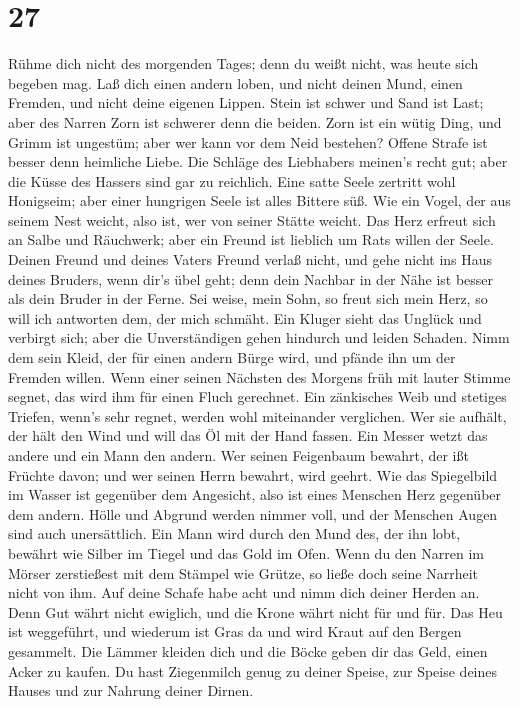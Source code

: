 \hypertarget{section-26}{%
\section{27}\label{section-26}}

 Rühme dich nicht des morgenden Tages; denn du weißt nicht,
was heute sich begeben mag.  Laß dich einen andern loben,
und nicht deinen Mund, einen Fremden, und nicht deine eigenen Lippen.
 Stein ist schwer und Sand ist Last; aber des Narren Zorn
ist schwerer denn die beiden.  Zorn ist ein wütig Ding, und
Grimm ist ungestüm; aber wer kann vor dem Neid bestehen? 
Offene Strafe ist besser denn heimliche Liebe.  Die Schläge
des Liebhabers meinen's recht gut; aber die Küsse des Hassers sind gar
zu reichlich.  Eine satte Seele zertritt wohl Honigseim;
aber einer hungrigen Seele ist alles Bittere süß.  Wie ein
Vogel, der aus seinem Nest weicht, also ist, wer von seiner Stätte
weicht.  Das Herz erfreut sich an Salbe und Räuchwerk; aber
ein Freund ist lieblich um Rats willen der Seele.  Deinen
Freund und deines Vaters Freund verlaß nicht, und gehe nicht ins Haus
deines Bruders, wenn dir's übel geht; denn dein Nachbar in der Nähe ist
besser als dein Bruder in der Ferne.  Sei weise, mein Sohn,
so freut sich mein Herz, so will ich antworten dem, der mich schmäht.
 Ein Kluger sieht das Unglück und verbirgt sich; aber die
Unverständigen gehen hindurch und leiden Schaden.  Nimm dem
sein Kleid, der für einen andern Bürge wird, und pfände ihn um der
Fremden willen.  Wenn einer seinen Nächsten des Morgens
früh mit lauter Stimme segnet, das wird ihm für einen Fluch gerechnet.
 Ein zänkisches Weib und stetiges Triefen, wenn's sehr
regnet, werden wohl miteinander verglichen.  Wer sie
aufhält, der hält den Wind und will das Öl mit der Hand fassen.
 Ein Messer wetzt das andere und ein Mann den andern.
 Wer seinen Feigenbaum bewahrt, der ißt Früchte davon; und
wer seinen Herrn bewahrt, wird geehrt.  Wie das Spiegelbild
im Wasser ist gegenüber dem Angesicht, also ist eines Menschen Herz
gegenüber dem andern.  Hölle und Abgrund werden nimmer
voll, und der Menschen Augen sind auch unersättlich.  Ein
Mann wird durch den Mund des, der ihn lobt, bewährt wie Silber im Tiegel
und das Gold im Ofen.  Wenn du den Narren im Mörser
zerstießest mit dem Stämpel wie Grütze, so ließe doch seine Narrheit
nicht von ihm.  Auf deine Schafe habe acht und nimm dich
deiner Herden an.  Denn Gut währt nicht ewiglich, und die
Krone währt nicht für und für.  Das Heu ist weggeführt, und
wiederum ist Gras da und wird Kraut auf den Bergen gesammelt.
 Die Lämmer kleiden dich und die Böcke geben dir das Geld,
einen Acker zu kaufen.  Du hast Ziegenmilch genug zu deiner
Speise, zur Speise deines Hauses und zur Nahrung deiner Dirnen.

